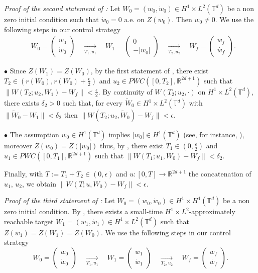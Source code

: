 \documentclass[a4paper]{article}
\theoremstyle{plain}
\newcommand{\T}{\mathbb{T}}
\newcommand{\R}{\mathbb{R}}
\begin{document}
\noindent \emph{Proof of the second statement of :}
Let $W_0=(w_0,\dot{w}_0) \in H^1 \times L^2(\T^d)$ be a non zero initial condition such that $\dot{w}_0=0$ a.e. on $Z(w_0)$. Then $w_0 \neq 0$. We use the following steps in our control strategy
$$\begin{aligned}
& W_0=\begin{pmatrix}
    w_0 \\ \dot{w}_0
\end{pmatrix}
\quad \xrightarrow[T_1,u_1]{} \quad
W_1=\begin{pmatrix}
    0 \\ -|w_0|
\end{pmatrix}
\quad \xrightarrow[T_2,u_2]{} \quad
W_f=\begin{pmatrix}
    w_f \\ \dot{w_f}
\end{pmatrix}.
\end{aligned}$$


\medskip

\noindent $\bullet$ Since $Z(W_1)=Z(W_0)$, by the first statement of , there exist 
$T_2 \in (r(W_0),r(W_0)+\frac{\epsilon}{2})$ and $u_2 \in PWC([0,T_2],\R^{2d+1})$ such that $\|W(T_2;u_2,W_1)-W_f\|<\frac{\epsilon}{2}$. By continuity of $W(T_2;u_2,\cdot)$ on $H^1 \times L^2(\T^d)$, there exists $\delta_2>0$ such that, for every $\widetilde{W}_0 \in H^1 \times L^2(\T^d)$ with $\|\widetilde{W}_0-W_1\|<\delta_2$ then $\| W(T_2;u_2,\widetilde{W}_0)-W_f\|<\epsilon$.

\medskip

\noindent $\bullet$ The assumption $w_0 \in H^1(\T^d)$ implies $|w_0| \in H^1(\T^d)$ (see, for instance, \cite[Theorem 4.4]{EvansGariepy}), moreover $Z(w_0)=Z(|w_0|)$ thus, by , there exist 
$T_1 \in (0,\frac{\epsilon}{2})$ and\newline$u_1 \in PWC([0,T_1],\R^{2d+1})$ such that $\|W(T_1;u_1,W_0)-W_f\|<\delta_2$. 


\medskip

Finally, with $T:=T_1+T_2 \in (0,\epsilon)$ and $u:[0,T] \to \R^{2d+1}$ the concatenation of $u_1$, $u_2$, we obtain $\|W(T;u,W_0)-W_f\|<\epsilon$.


\bigskip

\noindent \emph{Proof of the third statement of :}
Let $W_0=(w_0,\dot{w}_0) \in H^1 \times H^1(\T^d)$ be a non zero initial condition. By , there exists a small-time $H^1 \times L^2$-approximately reachable target $W_1=(w_1,\dot{w}_1) \in H^1 \times L^2(\T^d)$ such that $Z(w_1)=Z(W_1)=Z(W_0)$. 
We use the following steps in our control strategy
$$W_0=\begin{pmatrix}
    w_0 \\ \dot{w}_0
\end{pmatrix}
\quad \xrightarrow[T_1,u_1]{} \quad
W_1=\begin{pmatrix}
    w_1 \\ \dot{w}_1
\end{pmatrix}
\quad \xrightarrow[T_2,u_2]{} \quad
W_f=\begin{pmatrix}
    w_f \\ \dot{w_f}
\end{pmatrix}.$$
\end{document}
